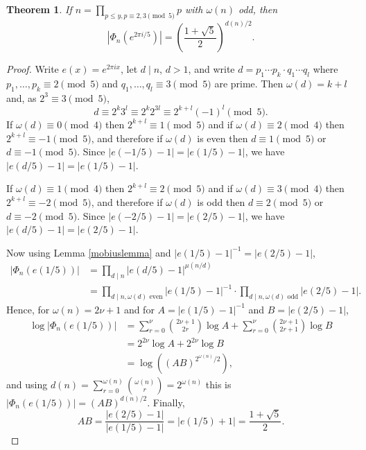 \documentclass{amsart}
\newtheorem{theorem}{Theorem}
\theoremstyle{definition}
\begin{document}
\begin{theorem}
If $n=\prod_{p \leq y, p \equiv 2,3 \pmod{5}} p$ with $\omega(n)$  odd, then
\[
|\Phi_n(e^{2\pi i/5})| = \left( \frac{1+\sqrt{5}}{2} \right)^{d(n)/2}.
\]
\label{demr}
\end{theorem}
\begin{proof}
Write $e(x)=e^{2\pi ix}$, let $d \mid n$, $d>1$, and write $d=p_1\cdots p_k \cdot q_1 \cdots q_l$ where
$p_1,\ldots,p_k \equiv 2 \pmod{5}$ and $q_1,\ldots,q_l \equiv 3 \pmod{5}$ are prime. Then
$\omega(d) = k+l$ and, as $2^3 \equiv 3 \pmod{5}$,
\[
d \equiv 2^k 3^l \equiv 2^k 2^{3l} \equiv 2^{k+l} (-1)^l \pmod{5}.
\]
If $\omega(d) \equiv 0 \pmod{4}$ then $2^{k+l} \equiv 1 \pmod{5}$
and if $\omega(d) \equiv 2 \pmod{4}$ then
$2^{k+l}  \equiv -1 \pmod{5}$, and therefore if $\omega(d)$ is even then 
$d \equiv 1 \pmod{5}$ or $d \equiv -1 \pmod{5}$. Since $|e(-1/5)-1|=|e(1/5)-1|$, we have
$|e(d/5)-1| = |e(1/5)-1|$.

If $\omega(d) \equiv 1 \pmod{4}$ then $2^{k+l} \equiv 2 \pmod{5}$ and if $\omega(d) \equiv 3 \pmod{4}$ then
$2^{k+l} \equiv -2 \pmod{5}$, and therefore if $\omega(d)$ is odd then
$d \equiv 2 \pmod{5}$ or $d \equiv -2 \pmod{5}$. Since $|e(-2/5)-1|=|e(2/5)-1|$, we have
$|e(d/5)-1| = |e(2/5)-1|$.

Now using Lemma \ref{mobiuslemma} and $|e(1/5)-1|^{-1} =  |e(2/5)-1|$,
\begin{align*}
|\Phi_n(e(1/5))|&=\prod_{d \mid n} |e(d/5)-1|^{\mu(n/d)}\\
&=\prod_{d \mid n, \textrm{$\omega(d)$ even}}  |e(1/5)-1|^{-1}
\cdot \prod_{d \mid n, \textrm{$\omega(d)$ odd}}  |e(2/5)-1|.
\end{align*}
Hence, for $\omega(n)=2\nu+1$ and for $A= |e(1/5)-1|^{-1}$ and $B=|e(2/5)-1|$,
\begin{align*}
\log |\Phi_n(e(1/5))|&=\sum_{r=0}^\nu \binom{2\nu+1}{2r} \log A + \sum_{r=0}^\nu \binom{2\nu+1}{2r+1} \log B\\
&=2^{2\nu} \log A + 2^{2\nu} \log B\\
&=\log((AB)^{2^{\omega(n)} /2}),
\end{align*}
and using $d(n)=\sum_{r=0}^{\omega(n)} \binom{\omega(n)}{r} = 2^{\omega(n)}$ this is $|\Phi_n(e(1/5))| = (AB)^{d(n)/2}$.
Finally,
\[
AB = \frac{|e(2/5)-1|}{|e(1/5)-1|} =|e(1/5)+1|= \frac{1+\sqrt{5}}{2}.
\]
\end{proof}
\end{document}
